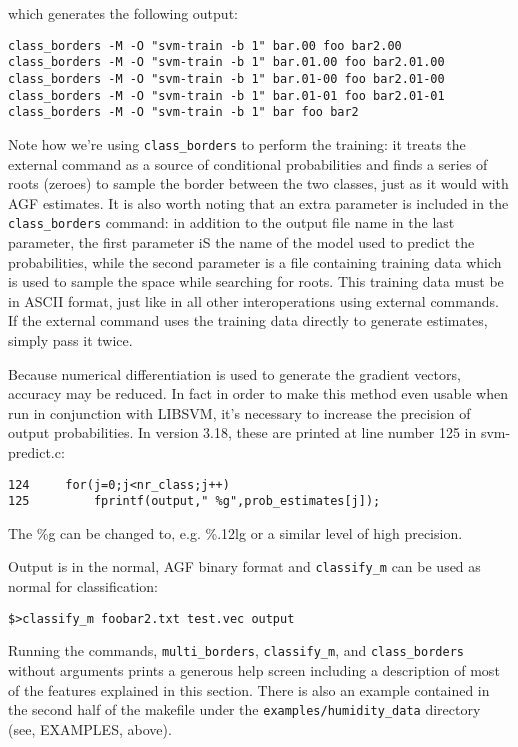 \documentclass[12pt]{article}
\begin{document}
which generates the following output:

\begin{verbatim}
class_borders -M -O "svm-train -b 1" bar.00 foo bar2.00
class_borders -M -O "svm-train -b 1" bar.01.00 foo bar2.01.00
class_borders -M -O "svm-train -b 1" bar.01-00 foo bar2.01-00
class_borders -M -O "svm-train -b 1" bar.01-01 foo bar2.01-01
class_borders -M -O "svm-train -b 1" bar foo bar2
\end{verbatim}

Note how we're using \verb/class_borders/ to perform the training: it treats the external command as a source of conditional probabilities and finds a series of roots (zeroes) to sample the border between the two classes, just as it would with AGF estimates.  It is also worth noting that an extra parameter is included in the \verb/class_borders/ command: in addition to the output file name in the last parameter, the first parameter iS the name of the model used to predict the probabilities, while the second parameter is a file containing training data which is used to sample the space while searching for roots.  This training data must be in ASCII format, just like in all other interoperations using external commands.  If the external command uses the training data directly to generate estimates, simply pass it twice.

Because numerical differentiation is used to generate the gradient vectors, accuracy may be reduced.  In fact in order to make this method even usable when run in conjunction with LIBSVM, it's necessary to increase the precision of output probabilities.  In version 3.18, these are printed at line number 125 in svm-predict.c:

\begin{verbatim}
124		for(j=0;j<nr_class;j++)
125			fprintf(output," %g",prob_estimates[j]);
\end{verbatim}

The \%g can be changed to, e.g. \%.12lg or a similar level of high precision.

Output is in the normal, AGF binary format and \verb/classify_m/ can be used as normal for classification:

\begin{verbatim}
$>classify_m foobar2.txt test.vec output
\end{verbatim}

Running the commands, \verb"multi_borders", \verb"classify_m", and \verb"class_borders" without arguments prints a generous help screen including a description of most of the features explained in this section.  There is also an example contained in the second half of the makefile under the \verb"examples/humidity_data" directory (see, EXAMPLES, above).

\nocite{Kohonen2000}
\nocite{Michie_etal1994}
\nocite{Terrell_Scott1992}
\nocite{Mills2014}


\end{document}
